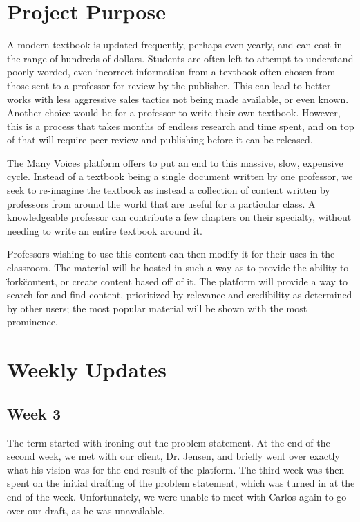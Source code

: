 \documentclass[onecolumn, draftclsnofoot,10pt, compsoc]{IEEEtran}
\begin{document}
\section{Project Purpose}
A modern textbook is updated frequently, perhaps even yearly, and can cost in the range of hundreds of dollars. 
Students are often left to attempt to understand poorly worded, even incorrect information from a textbook 
often chosen from those sent to a professor for review by the publisher. This can lead to better works with 
less aggressive sales tactics not being made available, or even known. Another choice would be for a 
professor to write their own textbook. However, this is a process that takes months of endless research 
and time spent, and on top of that will require peer review and publishing before it can be released.

The Many Voices platform offers to put an end to this massive, slow, expensive cycle.  
Instead of a textbook being a single document written by one professor, we seek to re-imagine 
the textbook as instead a collection of content written by professors from around the world 
that are useful for a particular class. A knowledgeable professor can contribute a few chapters 
on their specialty, without needing to write an entire textbook around it.

Professors wishing to use this content can then modify it for their uses in the classroom. 
The material will be hosted in such a way as to provide the ability to \"fork\" content, or 
create content based off of it. The platform will provide a way to search for and find content, 
prioritized by relevance and credibility as determined by other users; the most popular material 
will be shown with the most prominence. 

\section{Weekly Updates}

\subsection{Week 3}
The term started with ironing out the problem statement. At the end of the 
second week, we met with our client, Dr. Jensen, and briefly went over exactly 
what his vision was for the end result of the platform. The third week was 
then spent on the initial drafting of the problem statement, which was turned 
in at the end of the week. Unfortunately, we were unable to meet with Carlos 
again to go over our draft, as he was unavailable.
\end{document}

